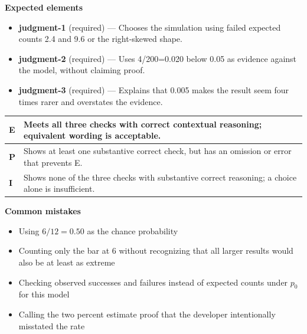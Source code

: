 \documentclass[11pt]{article}
\begin{document}

\textbf{Expected elements}
\begin{itemize}[leftmargin=1.5em,itemsep=2pt,topsep=2pt]
  \item \textbf{judgment-1} (required) --- Chooses the simulation using failed expected counts 2.4 and 9.6 or the right-skewed shape.
  \item \textbf{judgment-2} (required) --- Uses 4/200=0.020 below 0.05 as evidence against the model, without claiming proof.
  \item \textbf{judgment-3} (required) --- Explains that 0.005 makes the result seem four times rarer and overstates the evidence.
\end{itemize}

{\small\renewcommand{\arraystretch}{1.25}
\noindent\begin{tabular}{|p{0.5in}|p{5.9in}|}
\hline
\textbf{E} & Meets all three checks with correct contextual reasoning; equivalent wording is acceptable. \\ \hline
\textbf{P} & Shows at least one substantive correct check, but has an omission or error that prevents E. \\ \hline
\textbf{I} & Shows none of the three checks with substantive correct reasoning; a choice alone is insufficient. \\ \hline
\end{tabular}}

\textbf{Common mistakes}
\begin{itemize}[leftmargin=1.5em,itemsep=2pt,topsep=2pt]
  \item Using $6/12=0.50$ as the chance probability
  \item Counting only the bar at 6 without recognizing that all larger results would also be at least as extreme
  \item Checking observed successes and failures instead of expected counts under $p_0$ for this model
  \item Calling the two percent estimate proof that the developer intentionally misstated the rate
\end{itemize}

\clearpage
{}
\end{document}
